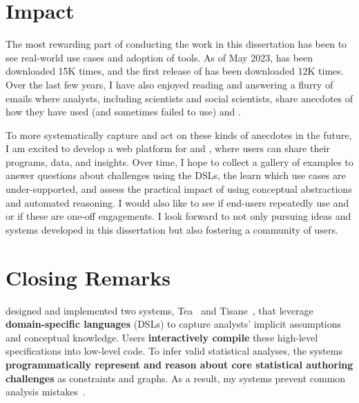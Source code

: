 \section{Impact}
The most rewarding part of conducting the work in this dissertation has been to
see real-world use cases and adoption of tools. As of May 2023, \tea has been
downloaded 15K times, and the first release of \tisane has been downloaded 12K
times. Over the last few years, I have also enjoyed reading and answering a
flurry of emails where analysts, including scientists and social scientists,
share anecdotes of how they have used (and sometimes failed to use) \tea and
\tisane.


To more systematically capture and act on these kinds of anecdotes in the
future, I am excited to develop a web platform for \tea and \tisane, where users
can share their programs, data, and insights. Over time, I hope to collect a
gallery of examples to answer questions about challenges using the DSLs, the
learn which use cases are under-supported, and assess the practical impact of
using conceptual abstractions and automated reasoning. I would also like to see
if end-users repeatedly use \tea and \tisane or if these are one-off
engagements. I look forward to not only pursuing ideas and systems developed in
this dissertation but also fostering a community of users. 


\section{Closing Remarks}

designed and implemented two systems, Tea~\cite{jun2019tea} and
Tisane~\cite{jun2022tisane}, that leverage \textbf{domain-specific languages}
(DSLs) to capture analysts' implicit assumptions and conceptual knowledge. Users
\textbf{interactively compile} these high-level specifications into low-level
code. To infer valid statistical analyses, the systems \textbf{programmatically
represent and reason about core statistical authoring challenges} as constraints
and graphs.%
As a result, my systems prevent common analysis
mistakes~\cite{jun2019tea,jun2022tisane}. 